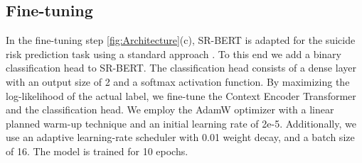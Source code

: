\documentclass[letterpaper]{article} %
\begin{document}
\subsection{Fine-tuning}

In the fine-tuning step \autoref{fig:Architecture}(c), SR-BERT is adapted for the  suicide risk prediction task using a standard approach \cite{sunHowFineTuneBERT2020}. %
To this end we add a binary classification head to SR-BERT. The classification head consists of a dense layer with an output size of 2 and a softmax activation function.
By maximizing the log-likelihood of the actual label, we fine-tune the Context Encoder Transformer and the classification head.
We employ the AdamW optimizer with a linear planned warm-up technique and an initial learning rate of 2e-5. Additionally, we use an adaptive learning-rate scheduler with 0.01 weight decay, and a batch size of 16. The model is trained for 10 epochs.



\begin{table}[]
\centering
\caption{SR prediction results of compared models. Bold highlights highest value.}
\end{table}
\end{document}
